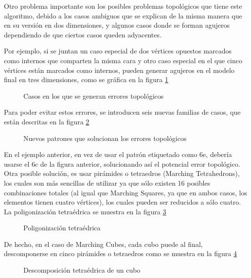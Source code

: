Otro problema importante son los posibles problemas topológicos que tiene este
algoritmo, debido a los casos ambiguos que se explican de la misma manera que en su versión en
dos dimensiones, y algunos casos donde se forman agujeros dependiendo de que ciertos casos
queden adyacentes.

Por ejemplo, si se juntan un caso especial de dos vértices opuestos marcados como
internos que comparten la misma cara y otro caso especial en el que cinco vértices están
marcados como internos, pueden generar agujeros en el modelo final en tres dimensiones, como
se gráfica en la figura \ref{f:estadoDelArte:MCAmbEx}

\begin{figure}[htbp]
\centering
\caption{Casos en los que se generan errores topológicos}
\label{f:estadoDelArte:MCAmbEx}
\end{figure}

Para poder evitar estos errores, se introducen seis nuevas familias de casos, que están descritas en
la figura \ref{f:estadoDelArte:MCAmb}

\begin{figure}[htb]
\centering
\caption{Nuevos patrones que solucionan los errores topológicos}
\label{f:estadoDelArte:MCAmb}
\end{figure}

En el ejemplo anterior, en vez de usar el patrón etiquetado como 6e, debería usarse el 6c
de la figura anterior, solucionando así el potencial error topológico.
Otra posible solución, es usar pirámides o tetraedros (Marching Tetrahedrons), los cuales
son más sencillas de utilizar ya que sólo existen 16 posibles combinaciones totales (al igual que
Marching Squares, ya que en ambos casos, los elementos tienen cuatro vértices), los cuales
pueden ser reducidos a sólo cuatro. La poligonización tetraédrica se muestra en la figura \ref{f:estadoDelArte:image_004}

\begin{figure}[htb]
\centering
\caption{Poligonización tetraédrica}
\label{f:estadoDelArte:image_004}
\end{figure}

De hecho, en el caso de Marching Cubes, cada cubo puede al final, descomponerse en
cinco pirámides o tetraedros como se muestra en la figura \ref{f:estadoDelArte:image_006}

\begin{figure}[htb]
\centering
\caption{Descomposición tetraédrica de un cubo}
\label{f:estadoDelArte:image_006}
\end{figure}
